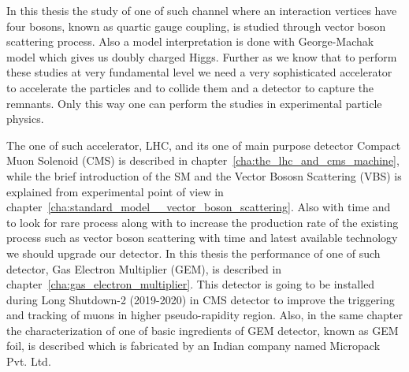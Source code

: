In this thesis the study of one of such channel where an interaction vertices have four bosons, known as quartic gauge coupling, is studied through vector boson scattering process.
Also a model interpretation is done with George-Machak model which gives us doubly charged Higgs.
Further as we know that to perform these studies at very fundamental level we need a very sophisticated accelerator to accelerate the particles and to collide them and a detector to capture the remnants.
Only this way one can perform the studies in experimental particle physics.

The one of such accelerator, LHC, and its one of main purpose detector Compact Muon Solenoid (CMS) is described in chapter~\ref{cha:the_lhc_and_cms_machine}, while the brief introduction of the SM and the Vector Bososn Scattering (VBS) is explained from experimental point of view in chapter~\ref{cha:standard_model__vector_boson_scattering}. Also with time and to look for rare process along with to increase the production rate of the existing process such as vector boson scattering with time and latest available technology we should upgrade our detector. In this thesis the performance of one of such detector, Gas Electron Multiplier (GEM), is described in chapter~\ref{cha:gas_electron_multiplier}. This detector is going to be installed during Long Shutdown-2 (2019-2020) in CMS detector to improve the triggering and tracking of muons in higher pseudo-rapidity region. Also, in the same chapter the characterization of one of basic ingredients of GEM detector, known as GEM foil, is described which is fabricated by an Indian company named Micropack Pvt. Ltd.



